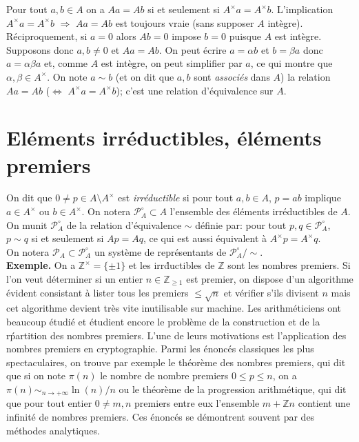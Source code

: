 \documentclass[a4paper, oneside, 12pt]{book}
\theoremstyle{theoremeStyle} %
\theoremstyle{definition} %
\newcommand{\Z}{\mathbb{Z}}
\begin{document}
  Pour tout $a,b\in A$ on a $Aa=Ab$ si et seulement si $A^\times a=A^\times b$. L'implication $A^\times a=A^\times b$ $\Rightarrow$ $Aa=Ab$ est toujours vraie (sans supposer $A$ intègre). Réciproquement,   si $a=0$ alors $Ab=0$ impose $b=0$ puisque $A$ est intègre. Supposons donc $a,b\not= 0$ et $Aa=Ab$. On peut écrire $a=\alpha b$ et $b=\beta a$ donc $a=\alpha\beta a$ et, comme $A$ est intègre, on peut simplifier par $a$, ce qui montre que $\alpha,\beta\in A^\times$. On note $a\sim b$ (et on dit que $a,b$ sont \textit{associés} dans $A$) la relation $Aa=Ab$ ($\Leftrightarrow$ $A^\times a=A^\times b$); c'est une relation d'équivalence sur $A$.




\section{Eléments irréductibles, éléments premiers}\label{IrrPrem}On dit que $0\not=p\in A\setminus A^\times$  est \textit{irréductible} si pour tout $a,b\in A$, $p=ab$ implique $a\in A^\times$ ou $b\in A^\times$. On notera $\mathcal{P}_A^\circ\subset A$ l'ensemble des éléments irréductibles de $A$.
  On munit  $\mathcal{P}_A^\circ$ de la relation d'équivalence $\sim$ définie par: pour tout $p,q\in \mathcal{P}_A^\circ$, $p\sim q$ si et seulement si $Ap=Aq$, ce qui est aussi équivalent à  $A^\times p=A^\times q$.\\

   On notera $\mathcal{P}_A\subset \mathcal{P}_A^\circ$ un système de représentants de $\mathcal{P}_A^\circ/\sim$.\\



  \textbf{Exemple.} On a $\Z^\times=\lbrace \pm 1\rbrace$ et les irr\'ductibles de $\Z$ sont les nombres premiers. Si l'on veut déterminer si un entier $n\in\Z_{\geq 1}$ est premier, on dispose d'un algorithme évident consistant à lister tous les premiers $\leq \sqrt{n}$ et vérifier s'ils divisent $n$ mais cet algorithme devient très vite inutilisable sur machine. Les arithméticiens ont beaucoup étudié et étudient encore  le problème de la construction et de la r\'partition des nombres premiers.  L'une de leurs motivations  est l'application des nombres premiers en cryptographie. Parmi les énoncés classiques  les plus spectaculaires, on trouve par exemple le théorème des nombres premiers, qui dit que si on note $\pi(n)$ le nombre de nombre premiers $0\leq  p\leq n$, on a $\pi(n)\sim_{n\to+\infty} \ln(n)/n$ ou le théorème de   la progression arithmétique, qui dit que pour tout entier $0\not= m,n$ premiers entre eux l'ensemble $m+\Z n$ contient une infinité de nombres premiers. Ces énoncés se démontrent souvent par des méthodes analytiques. \\
\end{document}
